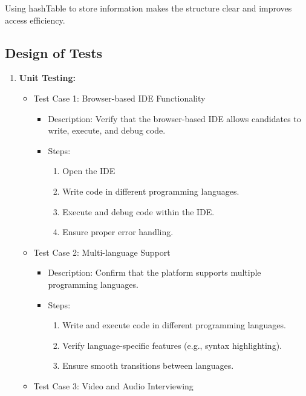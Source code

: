 \documentclass{article}
\begin{document}
Using hashTable to store information makes the structure clear and improves access efficiency.

\subsection{Design of Tests}
\begin{enumerate}
  \item \textbf{Unit Testing:}
  \begin{itemize}
    \item Test Case 1: Browser-based IDE Functionality
    \begin{itemize}
      \item Description: Verify that the browser-based IDE allows candidates to write, execute, and debug code.
      \item Steps: 
      \begin{enumerate}
        \item Open the IDE
        \item Write code in different programming languages.
        \item Execute and debug code within the IDE.
        \item Ensure proper error handling.
      \end{enumerate}
    \end{itemize}
  \end{itemize}
  \begin{itemize}
    \item Test Case 2: Multi-language Support
    \begin{itemize}
      \item Description: Confirm that the platform supports multiple programming languages.
      \item Steps: 
      \begin{enumerate}
        \item Write and execute code in different programming languages.
        \item Verify language-specific features (e.g., syntax highlighting).
        \item Ensure smooth transitions between languages.
      \end{enumerate}
    \end{itemize}
  \end{itemize}
  \begin{itemize}
    \item Test Case 3: Video and Audio Interviewing
    \begin{itemize}

\end{itemize}
\end{itemize}
\end{enumerate}
\end{document}

